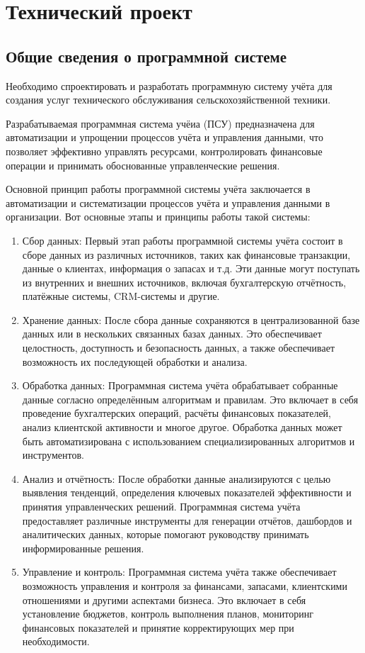 \newsection
\section{Технический проект}
\subsection{Общие сведения о программной системе}

Необходимо спроектировать и разработать программную систему учёта для создания услуг технического обслуживания сельскохозяйственной техники.

Разрабатываемая программная система учёиа (ПСУ) предназначена для автоматизации и упрощении процессов учёта и управления данными, что позволяет эффективно управлять ресурсами, контролировать финансовые операции и принимать обоснованные управленческие решения.

Основной принцип работы программной системы учёта заключается в автоматизации и систематизации процессов учёта и управления данными в организации. Вот основные этапы и принципы работы такой системы:
\begin{enumerate}
	\item Сбор данных:
	Первый этап работы программной системы учёта состоит в сборе данных из различных источников, таких как финансовые транзакции, данные о клиентах, информация о запасах и т.д. Эти данные могут поступать из внутренних и внешних источников, включая бухгалтерскую отчётность, платёжные системы, CRM-системы и другие.
	\item Хранение данных:
	После сбора данные сохраняются в централизованной базе данных или в нескольких связанных базах данных. Это обеспечивает целостность, доступность и безопасность данных, а также обеспечивает возможность их последующей обработки и анализа.
	\item Обработка данных:
	Программная система учёта обрабатывает собранные данные согласно определённым алгоритмам и правилам. Это включает в себя проведение бухгалтерских операций, расчёты финансовых показателей, анализ клиентской активности и многое другое. Обработка данных может быть автоматизирована с использованием специализированных алгоритмов и инструментов.
	\item Анализ и отчётность:
	После обработки данные анализируются с целью выявления тенденций, определения ключевых показателей эффективности и принятия управленческих решений. Программная система учёта предоставляет различные инструменты для генерации отчётов, дашбордов и аналитических данных, которые помогают руководству принимать информированные решения.
	\item Управление и контроль:
	Программная система учёта также обеспечивает возможность управления и контроля за финансами, запасами, клиентскими отношениями и другими аспектами бизнеса. Это включает в себя установление бюджетов, контроль выполнения планов, мониторинг финансовых показателей и принятие корректирующих мер при необходимости.
\end{enumerate}

